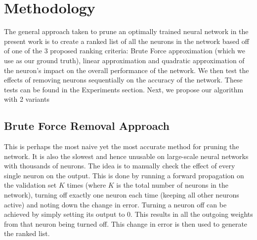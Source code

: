 \section{Methodology}
The general approach taken to prune an optimally trained neural network in the present work is to create a ranked list of all the neurons in the network based off of one of the 3 proposed ranking criteria: Brute Force approximation (which we use as our ground truth), linear approximation and quadratic approximation of the neuron's impact on the overall performance of the network. We then test the effects of removing neurons sequentially on the accuracy of the network. These tests can be found in the Experiments section. Next, we propose our algorithm with 2 variants

\subsection{Brute Force Removal Approach}
This is perhaps the most naive yet the most accurate method for pruning the network. It is also the slowest and hence unusable on large-scale neural networks with thousands of neurons. The idea is to manually check the effect of every single neuron on the output. This is done by running a forward propagation on the validation set $K$ times (where $K$ is the total number of neurons in the network), turning off exactly one neuron each time (keeping all other neurons active) and noting down the change in error. Turning a neuron off can be achieved by simply setting its output to 0. This results in all the outgoing weights from that neuron being turned off. This change in error is then used to generate the ranked list. 




